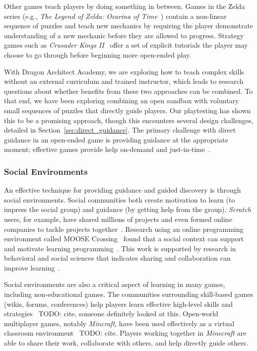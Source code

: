 \documentclass{sig-alternate}
\newcommand{\TODO}[1]{{\color{red} TODO: #1}}
\newcommand{\gametitle}{{\color{RoyalPurple} Dragon Architect Academy}}
\begin{document}
Other games teach players by doing something in between. 
Games in the Zelda series (e.g., \emph{The Legend of Zelda: Ocarina of Time}~\cite{zelda_oot}) contain a non-linear sequence of puzzles and teach new mechanics by requiring the player demonstrate understanding of a new mechanic before they are allowed to progress. 
Strategy games such as \emph{Crusader Kings II}~\cite{ck2} offer a set of explicit tutorials the player may choose to go through before beginning more open-ended play.

With \gametitle{}, we are exploring how to teach complex skills without an external curriculum and trained instructor, which leads to research questions about whether benefits from these two approaches can be combined.
To that end, we have been exploring combining an open sandbox with voluntary small sequences of puzzles that directly guide players.
Our playtesting has shown this to be a promising approach, though this encounters several design challenges, detailed in Section~\ref{sec:direct_guidance}.
The primary challenge with direct guidance in an open-ended game is providing guidance at the appropriate moment;
effective games provide help on-demand and just-in-time~\cite{gee2003video}.

\subsubsection{Social Environments}
\label{sec:social}

An effective technique for providing guidance and guided discovery is through social environments.
Social communities both create motivation to learn (to impress the social group) and guidance (by getting help from the group).
\emph{Scratch} users, for example, have shared millions of projects and even formed online companies to tackle projects together~\cite{resnick2009scratch}. 
Research using an online programming environment called MOOSE Crossing~\cite{bruckman1997moose} found that a social context can support and motivate learning programming~\cite{bruckman2000situated}.
This work is supported by research in behavioral and social sciences that indicates sharing and collaboration can improve learning~\cite{bransford2000people}. 

Social environments are also a critical aspect of learning in many games, including non-educational games.
The communities surrounding skill-based games (wikis, forums, conferences) help players learn effective high-level skills and strategies~\TODO{cite, someone definitely looked at this}.
Open-world multiplayer games, notably \emph{Mincraft}, have been used effectively as a virtual classroom environment~\TODO{cite}.
Players working together in \emph{Minecraft} are able to share their work, collaborate with others, and help directly guide others.
\end{document}
